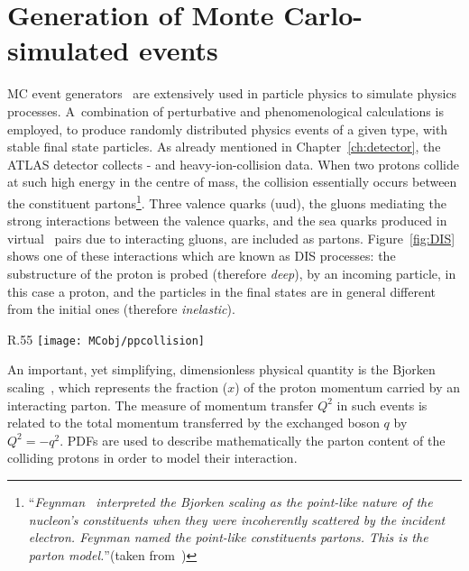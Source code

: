 	\section{Generation of Monte Carlo-simulated events}
	\label{sec:evGen}

		\ac{MC} event generators~\cite{Buckley:2011ms} are extensively used in particle physics to simulate physics processes. A combination of perturbative and phenomenological calculations is employed, to produce randomly distributed physics events of a given type, with stable final state particles. As already mentioned in Chapter~\ref{ch:detector}, the \ac{ATLAS} detector collects \pp- and heavy-ion-collision data. When two protons collide at such high energy in the centre of mass, the collision essentially occurs between the constituent partons\footnote{``\emph{Feynman~\cite{PhysRevLett.23.1415} interpreted the Bjorken scaling as the point-like nature of the nucleon's constituents when they were incoherently scattered by the incident electron. Feynman named the point-like constituents partons. This is the parton model.}''(taken from~\cite{Yan:2014kna})}. Three valence quarks (uud), the gluons mediating the strong interactions between the valence quarks, and the sea quarks produced in virtual \qqbar\ pairs due to interacting gluons, are included as partons. Figure~\ref{fig:DIS} shows one of these interactions which are known as \ac{DIS} processes: the substructure of the proton is probed (therefore \emph{deep}), by an incoming particle, in this case a proton, and the particles in the final states are in general different from the initial ones (therefore \emph{inelastic}).

		\begin{wrapfigure}{R}{.55\textwidth}
			\centering\texttt{[image: MCobj/ppcollision]}
			\caption{\label{fig:DIS} Example of a \pp\ \ac{DIS} event.}
		\end{wrapfigure}
		
		An important, yet simplifying, dimensionless physical quantity is the Bjorken scaling~\cite{PhysRev.179.1547}, which represents the fraction ($x$) of the proton momentum carried by an interacting parton. The measure of momentum transfer $Q^2$ in such events is related to the total momentum transferred by the exchanged boson $q$ by $Q^2 = -q^2$. \acp{PDF} are used to describe mathematically the parton content of the colliding protons in order to model their interaction.  

